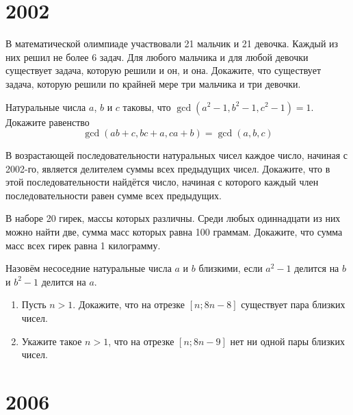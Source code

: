 \documentclass[11pt, a4paper]{common/document_template}
\begin{document}
\chapter{2002}

\begin{exercise}[1805]
В математической олимпиаде участвовали 21 мальчик и 21 девочка. Каждый
из них решил не более 6 задач. Для любого мальчика и для любой девочки
существует задача, которую решили и он, и она. Докажите, что существует задача, которую решили по крайней мере три мальчика и три девочки.
\end{exercise}

\begin{exercise}[1812]
Натуральные числа $a$, $b$ и $c$ таковы, что $\gcd(a^{2} - 1, b^{2} - 1, c^{2} - 1) = 1$. Докажите равенство 
$$
\gcd(ab + c, bc + a, ca + b) = \gcd(a, b, c)
$$
\end{exercise}

\begin{exercise}[1830]
В возрастающей последовательности натуральных чисел каждое число, начиная с 2002-го, является делителем суммы всех предыдущих чисел. Докажите, что в этой последовательности найдётся число, начиная с которого каждый член последовательности равен сумме всех предыдущих.
\end{exercise}

\begin{exercise}[1831]
В наборе 20 гирек, массы которых различны. Среди любых одиннадцати из них
можно найти две, сумма масс которых равна 100 граммам. Докажите, что сумма масс всех гирек равна 1 килограмму.
\end{exercise}

\begin{exercise}[1845]
Назовём несоседние натуральные числа $a$ и $b$ близкими, если $a^{2} - 1$ делится на $b$ и $b^{2} - 1$ делится на $a$.
\begin{enumerate}
\item Пусть $n > 1$. Докажите, что на отрезке $[n; 8n - 8]$ существует пара близких чисел.
\item Укажите такое $n > 1$, что на отрезке $[n; 8n - 9]$ нет ни одной пары близких чисел.
\end{enumerate} 
\end{exercise}

\chapter{2006}
\end{document}
